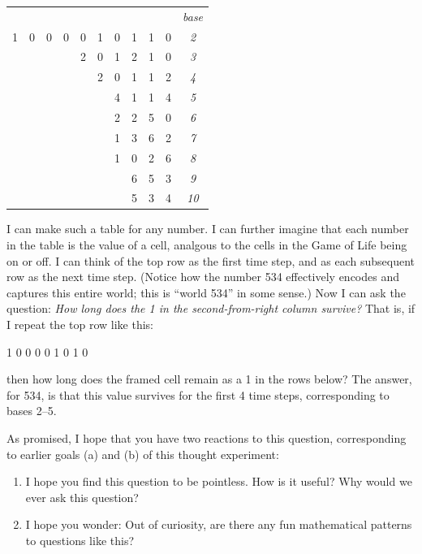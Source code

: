 \documentclass[11pt, oneside]{article}   	%
\begin{document}
\begin{center}
\begin{tabular}{cccccccccc|c}
  &   &   &   &   &   &   &   &   &   &\em base \\
1 & 0 & 0 & 0 & 0 & 1 & 0 & 1 & 1 & 0 & \it 2 \\
  &   &   &   & 2 & 0 & 1 & 2 & 1 & 0 & \it 3 \\
  &   &   &   &   & 2 & 0 & 1 & 1 & 2 & \it 4 \\
  &   &   &   &   &   & 4 & 1 & 1 & 4 & \it 5 \\
  &   &   &   &   &   & 2 & 2 & 5 & 0 & \it 6 \\
  &   &   &   &   &   & 1 & 3 & 6 & 2 & \it 7 \\
  &   &   &   &   &   & 1 & 0 & 2 & 6 & \it 8 \\
  &   &   &   &   &   &   & 6 & 5 & 3 & \it 9 \\
  &   &   &   &   &   &   & 5 & 3 & 4 & \it 10 \\
\end{tabular}
\end{center}

I can make such a table for any number.
I can further imagine that each number in the table is the value of a cell,
analgous to the cells in the Game of Life being on or off.
I can think of the
top row as the first time step, and as each subsequent row as the next time
step.
(Notice how the number 534 effectively encodes and captures this entire
world; this is ``world 534'' in some sense.)
Now I can ask the question:
{\em How long does the 1 in the second-from-right column survive?}
That is, if I repeat the top row like this:
\begin{center}
    1 0 0 0 0 1 0 1  0
\end{center}
then how long does the framed cell
remain as a 1 in the rows below?
The answer, for 534, is that this value survives for the first 4
time steps, corresponding to bases 2--5.

As promised, I hope that you have two reactions to this question, corresponding
to earlier goals (a) and (b) of this thought experiment:
\begin{enumerate}
    \item I hope you find this question to be pointless. How is it useful?
        Why would we ever ask this question?
    \item I hope you wonder:
        Out of curiosity, are there any fun mathematical patterns to questions
        like this?
\end{enumerate}
\end{document}
